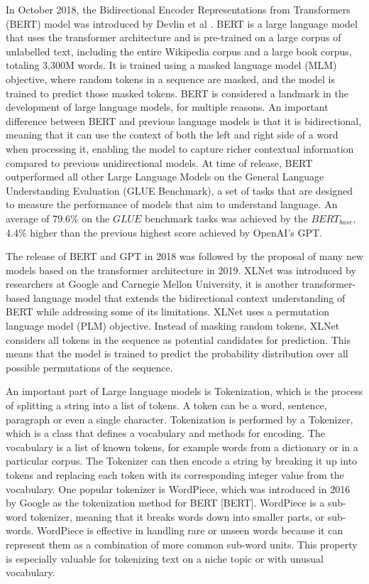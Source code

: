 \documentclass{UoYCSproject}
\begin{document}
    In October 2018, the Bidirectional Encoder Representations from Transformers (BERT) model was introduced by Devlin et al \cite{devlin2019bert} .
    BERT is a large language model that uses the transformer architecture and is pre-trained on a large corpus of unlabelled text, including the entire Wikipedia corpus and a large book corpus, totaling 3,300M words.
    It is trained using a masked language model (MLM) objective, where random tokens in a sequence are masked, and the model is trained to predict those masked tokens.
    BERT is considered a landmark in the development of large language models, for multiple reasons.
    An important difference between BERT and previous language models is that it is bidirectional, meaning that it can
    use the context of both the left and right side of a word when processing it, enabling the model to capture richer contextual information compared to previous unidirectional models.
    At time of release, BERT outperformed all other Large Language Models on the General Language Understanding Evaluation (GLUE Benchmark), a set of tasks that are designed to measure the performance of models that aim to understand language.
    An average of 79.6\% on the $GLUE$ benchmark tasks was achieved by the $BERT_{base}$, 4.4\% higher than the previous highest score achieved by OpenAI's GPT.

    The release of BERT and GPT in 2018 was followed by the proposal of many new models based on the transformer architecture in 2019.
    XLNet was introduced by researchers at Google and Carnegie Mellon University, it is another transformer-based language model that extends the bidirectional context understanding of BERT while addressing some of its limitations.
    XLNet uses a permutation language model (PLM) objective.
    Instead of masking random tokens, XLNet considers all tokens in the sequence as potential candidates for prediction.
    This means that the model is trained to predict the probability distribution over all possible permutations of the sequence.


    An important part of Large language models is Tokenization, which is the process of splitting a string into a list of
    tokens.
    A token can be a word, sentence, paragraph or even a single character.
    Tokenization is performed by a Tokenizer, which is a class that defines a vocabulary and methods for encoding.
    The vocabulary is a list of known tokens, for example words from a dictionary or in a particular corpus.
    The Tokenizer can then encode a string by breaking it up into tokens and replacing each token with its corresponding integer value from the vocabulary.
    One popular tokenizer is WordPiece, which was introduced in 2016 by Google as the tokenization method for BERT [BERT].
    WordPiece is a sub-word tokenizer, meaning that it breaks words down into smaller parts, or sub-words.
    WordPiece is effective in handling rare or unseen words because it can represent them as a combination of more common sub-word units.
    This property is especially valuable for tokenizing text on a niche topic or with unusual vocabulary. \par
\end{document}
